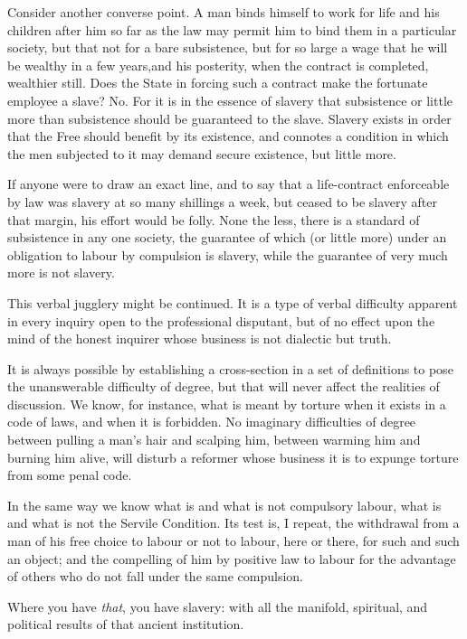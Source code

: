 \documentclass{book}
\begin{document}
Consider another converse point. A man binds himself to work for life and his children after him so far as the law may permit him to bind them in a particular society, but that not for a bare subsistence, but for so large a wage that he will be wealthy in a few years,and his posterity, when the contract is completed, wealthier still. Does the State in forcing such a contract make the fortunate employee a slave? No. For it is in the essence of slavery that subsistence or little more than subsistence should be guaranteed to the slave. Slavery exists in order that the Free should benefit by its existence, and connotes a condition in which the men subjected to it may demand secure existence, but little more.

If anyone were to draw an exact line, and to say that a life-contract enforceable by law was slavery at so many shillings a week, but ceased to be slavery after that margin, his effort would be folly. None the less, there is a standard of subsistence in any one society, the guarantee of which (or little more) under an obligation to labour by compulsion is slavery, while the guarantee of very much more is not slavery.

This verbal jugglery might be continued. It is a type of verbal difficulty apparent in every inquiry open to the professional disputant, but of no effect upon the mind of the honest inquirer whose business is not dialectic but truth.

It is always possible by establishing a cross-section in a set of definitions to pose the unanswerable difficulty of degree, but that will never affect the realities of discussion. We know, for instance, what is meant by torture when it exists in a code of laws, and when it is forbidden. No imaginary difficulties of degree between pulling a man’s hair and scalping him, between warming him and burning him alive, will disturb a reformer whose business it is to expunge torture from some penal code.

In the same way we know what is and what is not compulsory labour, what is and what is not the Servile Condition. Its test is, I repeat, the withdrawal from a man of his free choice to labour or not to labour, here or there, for such and such an object; and the compelling of him by positive law to labour for the advantage of others who do not fall under the same compulsion.

Where you have \emph{that}, you have slavery: with all the manifold, spiritual, and political results of that ancient institution.
\end{document}
